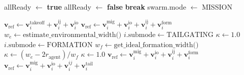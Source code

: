 \documentclass[pdflatex,sn-basic]{sn-jnl}%
\begin{document}
        \begin{algorithm}
        \begingroup\small
            \caption{High-Level Planner Pseudocode}
            \label{alg:high_level_planner}
            \begin{algorithmic}[1]
                \State {}
                    \State allReady $\gets$ \textbf{true}
                            \State allReady $\gets$ \textbf{false}
                            \State \textbf{break}
                        \EndIf
                    \EndFor
                        \State swarm.mode $\gets$ MISSION
                    \EndIf
                \EndIf

                \State {}
                     
                        \State $\boldsymbol{v}_{\text{ref}} \gets \boldsymbol{v}_{i}^{\text{takeoff}} + \boldsymbol{v}_{i}^{\text{ij}} + \boldsymbol{v}_{i}^{\text{io}}$
                    \Else {}
                         
                            \State $\boldsymbol{v}_{\text{ref}} \gets \boldsymbol{v}_{i}^{\text{mig}} + \boldsymbol{v}_{i}^{\text{io}} + \boldsymbol{v}_{i}^{\text{ij}} + \boldsymbol{v}_{i}^{\text{form}}$
                        \Else {}
                            \State $w_e \gets \text{estimate\_environmental\_width()}$
                             
                                \State $i.\text{submode} \gets \text{TAILGATING}$
                                \State $\kappa \gets 1.0$
                            \Else
                                \State $i.\text{submode} \gets \text{FORMATION}$ 
                                \State $w_f \gets \text{get\_ideal\_formation\_width()}$
                                  
                                    \State $\kappa \gets (w_e - 2r_{\text{agent}}) / w_f$
                                \Else
                                    \State $\kappa \gets 1.0$
                                \EndIf
                            \EndIf
                                \State $\boldsymbol{v}_{\text{ref}} \gets \boldsymbol{v}_{i}^{\text{mig}} + \boldsymbol{v}_{i}^{\text{io}} + \boldsymbol{v}_{i}^{\text{ij}} + \boldsymbol{v}_{i}^{\text{form}}$
                            \Else
                                \State $\boldsymbol{v}_{\text{ref}} \gets \boldsymbol{v}_{i}^{\text{mig}} + \boldsymbol{v}_{i}^{\text{io}} + \boldsymbol{v}_{i}^{ij} + \boldsymbol{v}_{i}^{\text{tail}}$
                            \EndIf
                        \EndIf


\end{algorithmic}
\end{algorithm}
\end{document}
